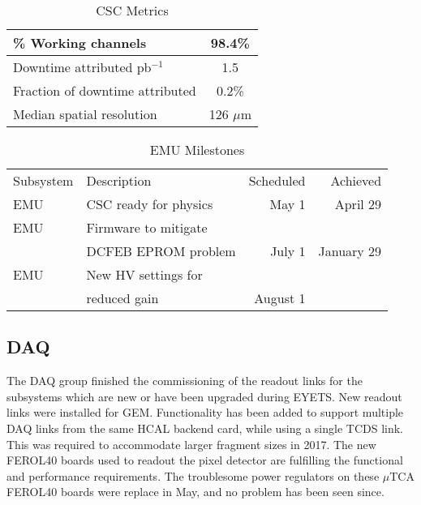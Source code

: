 \vskip 0.2in

\begin{table}[htp]
\caption{CSC Metrics}
\begin{center}
\begin{tabular}{|l|c|}
\hline
 \% Working channels & 98.4\%  \\
\hline
Downtime attributed pb$^{-1}$ & 1.5 \\
Fraction of downtime attributed& 0.2\% \\
\hline
Median spatial resolution &  126 $\mu$m \\
\hline
\end{tabular}
\end{center}
\label{CSCMetrics}
\end{table}%



 \begin{table}[htp]
\caption{EMU Milestones}
\begin{center}
\begin{tabular}{|l|l|r|r|}
\hline
Subsystem&Description&Scheduled&Achieved\\
EMU& CSC ready for physics& May 1& April 29 \\
\hline
EMU& Firmware to mitigate & &\\ 
   & DCFEB EPROM problem &July 1 & January 29 \\
\hline
EMU & New HV settings for  & & \\
&reduced gain & August 1 &  \\
\hline
\end{tabular}
\end{center}
\label{EMUMilestones}
\end{table}%


\subsection{DAQ}
The DAQ group finished the commissioning of the readout links for the subsystems which are new or have been upgraded during EYETS. New readout links were installed for GEM. 
Functionality has been added to support multiple DAQ links from the same HCAL backend card, while using a single TCDS link. This was required to accommodate larger fragment sizes in 2017.
The new FEROL40 boards used to readout the pixel detector are fulfilling the functional and performance requirements. The troublesome power regulators on these $\mu$TCA FEROL40 boards were replace in May, and no problem has been seen since.


